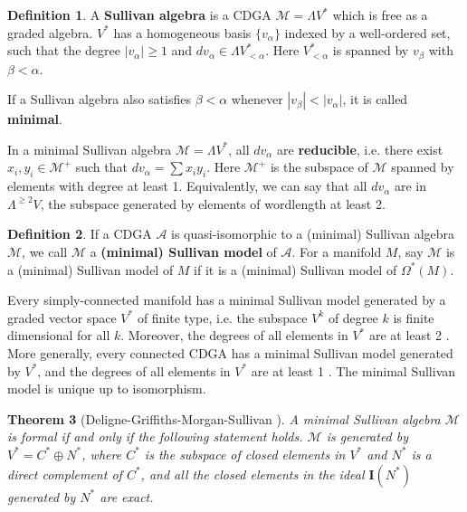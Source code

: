 \documentclass{article}
\theoremstyle{plain}
\newtheorem{thm}{Theorem}[section]
\theoremstyle{definition}
\newtheorem{defn}[thm]{Definition}
\theoremstyle{plain}
\numberwithin{equation}{section}
\begin{document}
\begin{defn}
A \textbf{Sullivan algebra} is a CDGA $\mathcal{M}=\Lambda V^*$ which is free as a graded algebra. $V^*$ has a homogeneous basis $\{v_{\alpha}\}$ indexed by a well-ordered set, such that the degree $|v_{\alpha}|\geq 1$ and $dv_{\alpha}\in\Lambda V^*_{<\alpha}$. Here $V^*_{<\alpha}$ is spanned by $v_{\beta}$ with $\beta<\alpha$.

If a Sullivan algebra also satisfies $\beta<\alpha$ whenever $|v_{\beta}|<|v_{\alpha}|$, it is called \textbf{minimal}.
\end{defn}

In a minimal Sullivan algebra $\mathcal{M}=\Lambda V^*$, all $dv_{\alpha}$ are \textbf{reducible}, i.e. there exist $x_i,y_i\in\mathcal{M}^+$ such that $dv_{\alpha}=\sum x_iy_i$. Here $\mathcal{M}^+$ is the subspace of $\mathcal{M}$ spanned by elements with degree at least 1. Equivalently, we can say that all $dv_{\alpha}$ are in $\Lambda^{\geq 2} V$, the subspace generated by elements of wordlength at least 2.

\begin{defn}
If a CDGA $\mathcal{A}$ is quasi-isomorphic to a (minimal) Sullivan algebra $\mathcal{M}$, we call $\mathcal{M}$ a \textbf{(minimal) Sullivan model} of $\mathcal{A}$. For a manifold $M$, say $\mathcal{M}$ is a (minimal) Sullivan model of $M$ if it is a (minimal) Sullivan model of $\Omega^*(M)$.
\end{defn}

Every simply-connected manifold has a minimal Sullivan model generated by a graded vector space $V^*$ of finite type, i.e. the subspace $V^k$ of degree $k$ is finite dimensional for all $k$. Moreover, the degrees of all elements in $V^*$ are at least 2 \cite{deli}. More generally, every connected CDGA has a minimal Sullivan model generated by $V^*$, and the degrees of all elements in $V^*$ are at least 1 \cite{Halperin}. The minimal Sullivan model is unique up to isomorphism.

\begin{thm}[Deligne-Griffiths-Morgan-Sullivan \cite{deli}]\label{C oplus N decomposition}
A minimal Sullivan algebra $\mathcal{M}$ is formal if and only if the following statement holds. $\mathcal{M}$ is generated by $V^*=C^*\oplus N^*$, where $C^*$ is the subspace of closed elements in $V^*$ and $N^*$ is a direct complement of $C^*$, and all the closed elements in the ideal $\mathbf{I}(N^*)$ generated by $N^*$ are exact.
\end{thm}
\end{document}
